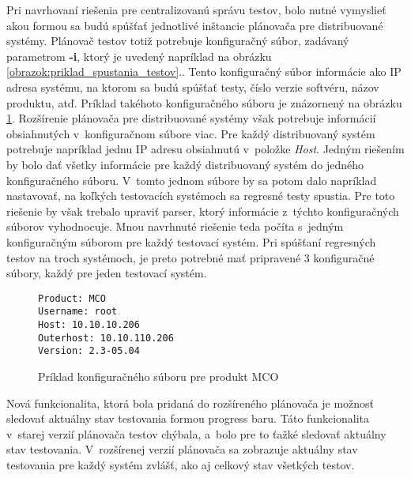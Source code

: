Pri navrhovaní riešenia pre centralizovanú správu testov, bolo nutné vymyslieť akou formou sa budú spúšťať 
jednotlivé inštancie plánovača pre distribuované systémy. Plánovač testov totiž potrebuje konfiguračný súbor,
zadávaný parametrom \textbf{-i}, ktorý je uvedený napríklad na obrázku \ref{obrazok:priklad_spustania_testov}..
Tento konfiguračný súbor informácie ako IP adresa systému, na ktorom sa budú spúšťať testy, číslo verzie softvéru, názov 
produktu, atď. Príklad takéhoto konfiguračného súboru je znázornený na obrázku \ref{obrazok:priklad_konfig_suboru}.
Rozšírenie plánovača pre distribuované systémy však potrebuje informácií obsiahnutých v~konfiguračnom súbore viac.
Pre každý distribuovaný systém potrebuje napríklad jednu IP adresu obsiahnutú v~položke \textit{Host}.
Jedným riešením by bolo dať všetky informácie pre každý distribuovaný systém do jedného konfiguračného súboru.
V~tomto jednom súbore by sa potom dalo napríklad nastavovať, na koľkých testovacích systémoch sa regresné testy spustia.
Pre toto riešenie by však trebalo upraviť parser, ktorý informácie z~týchto konfiguračných súborov vyhodnocuje.
Mnou navrhnuté riešenie teda počíta s~jedným konfiguračným súborom pre každý testovací systém.
Pri spúšťaní regresných testov na troch systémoch, je preto potrebné mať pripravené 3 konfiguračné súbory,
každý pre jeden testovací systém. 

\begin{figure}[h]
\begin{lstlisting}
Product: MCO
Username: root
Host: 10.10.10.206
Outerhost: 10.10.110.206
Version: 2.3-05.04
\end{lstlisting}
\caption{Príklad konfiguračného súboru pre produkt MCO}
\label{obrazok:priklad_konfig_suboru}
\end{figure}

Nová funkcionalita, ktorá bola pridaná do rozšíreného plánovača je možnosť sledovať aktuálny stav testovania
formou progress baru. Táto funkcionalita v~starej verzií plánovača testov chýbala, a~bolo pre to ťažké sledovať aktuálny
stav testovania. V~rozšírenej verzií plánovača sa zobrazuje aktuálny stav testovania pre každý systém zvlášť, ako aj
celkový stav všetkých testov.

